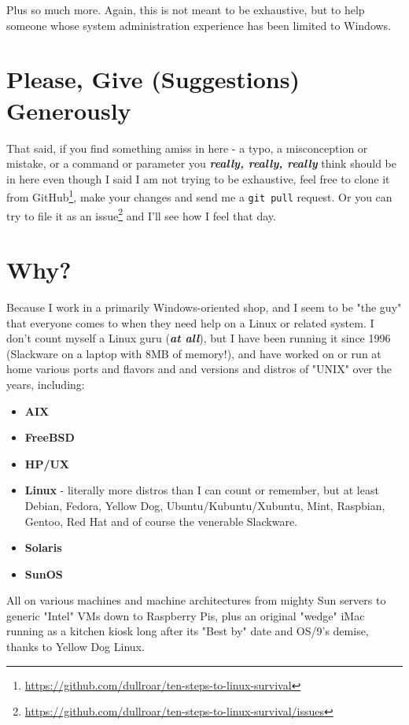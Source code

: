 \documentclass[10pt,american,]{book}
\renewcommand{\href}[2]{#2\footnote{\url{#1}}}
\numberwithin{figure}{chapter}
\begin{document}
Plus so much more. Again, this is not meant to be exhaustive, but to
help someone whose system administration experience has been limited to
Windows.

\section*{Please, Give (Suggestions)
Generously}\label{please-give-suggestions-generously}

That said, if you find something amiss in here - a typo, a misconception
or mistake, or a command or parameter you \textbf{\emph{really, really,
really}} think should be in here even though I said I am not trying to
be exhaustive, feel free to
\href{https://github.com/dullroar/ten-steps-to-linux-survival}{clone it
from GitHub}, make your changes and send me a \texttt{git\ pull}
request. Or you can try to
\href{https://github.com/dullroar/ten-steps-to-linux-survival/issues}{file
it as an issue} and I'll see how I feel that day.

\section*{Why?}\label{why}

Because I work in a primarily Windows-oriented shop, and I seem to be
"the guy" that everyone comes to when they need help on a Linux or
related system. I don't count myself a Linux guru (\textbf{\emph{at
all}}), but I have been running it since 1996 (Slackware on a laptop
with 8MB of memory!), and have worked on or run at home various ports
and flavors and and versions and distros of "UNIX" over the years,
including:

\begin{itemize}
\item
  \textbf{AIX}
\item
  \textbf{FreeBSD}
\item
  \textbf{HP/UX}
\item
  \textbf{Linux} - literally more distros than I can count or remember,
  but at least Debian, Fedora, Yellow Dog, Ubuntu/Kubuntu/Xubuntu, Mint,
  Raspbian, Gentoo, Red Hat and of course the venerable Slackware.
\item
  \textbf{Solaris}
\item
  \textbf{SunOS}
\end{itemize}

All on various machines and machine architectures from mighty Sun
servers to generic "Intel" VMs down to Raspberry Pis, plus an original
"wedge" iMac running as a kitchen kiosk long after its "Best by" date
and OS/9's demise, thanks to Yellow Dog Linux.
\end{document}
